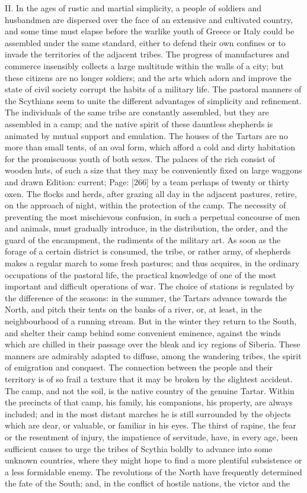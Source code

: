 II. In the ages of rustic and martial simplicity, a people of soldiers and husbandmen are dispersed over the face of an extensive and cultivated country, and some time must elapse before the warlike youth of Greece or Italy could be assembled under the same standard, either to defend their own confines or to invade the territories of the adjacent tribes. The progress of manufactures and commerce insensibly collects a large multitude within the walls of a city; but these citizens are no longer soldiers; and the arts which adorn and improve the state of civil society corrupt the habits of a military life. The pastoral manners of the Scythians seem to unite the different advantages of simplicity and refinement. The individuals of the same tribe are constantly assembled, but they are assembled in a camp; and the native spirit of these dauntless shepherds is animated by mutual support and emulation. The houses of the Tartars are no more than small tents, of an oval form, which afford a cold and dirty habitation for the promiscuous youth of both sexes. The palaces of the rich consist of wooden huts, of such a size that they may be conveniently fixed on large waggons and drawn Edition: current; Page: [266] by a team perhaps of twenty or thirty oxen. The flocks and herds, after grazing all day in the adjacent pastures, retire, on the approach of night, within the protection of the camp. The necessity of preventing the most mischievous confusion, in such a perpetual concourse of men and animals, must gradually introduce, in the distribution, the order, and the guard of the encampment, the rudiments of the military art. As soon as the forage of a certain district is consumed, the tribe, or rather army, of shepherds makes a regular march to some fresh pastures; and thus acquires, in the ordinary occupations of the pastoral life, the practical knowledge of one of the most important and difficult operations of war. The choice of stations is regulated by the difference of the seasons: in the summer, the Tartars advance towards the North, and pitch their tents on the banks of a river, or, at least, in the neighbourhood of a running stream. But in the winter they return to the South, and shelter their camp behind some convenient eminence, against the winds which are chilled in their passage over the bleak and icy regions of Siberia. These manners are admirably adapted to diffuse, among the wandering tribes, the spirit of emigration and conquest. The connection between the people and their territory is of so frail a texture that it may be broken by the slightest accident. The camp, and not the soil, is the native country of the genuine Tartar. Within the precincts of that camp, his family, his companions, his property, are always included; and in the most distant marches he is still surrounded by the objects which are dear, or valuable, or familiar in his eyes. The thirst of rapine, the fear or the resentment of injury, the impatience of servitude, have, in every age, been sufficient causes to urge the tribes of Scythia boldly to advance into some unknown countries, where they might hope to find a more plentiful subsistence or a less formidable enemy. The revolutions of the North have frequently determined the fate of the South; and, in the conflict of hostile nations, the victor and the 